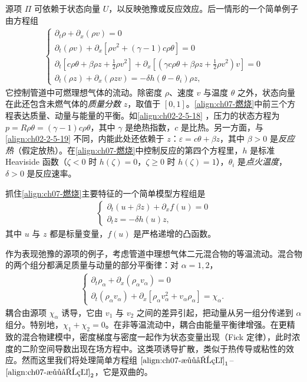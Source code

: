\documentclass[../../main.tex]{subfiles}
\begin{document}
源项 $\Pi$ 可依赖于状态向量 $U$，以反映弛豫或反应效应。后一情形的一个简单例子由方程组
\begin{align}
\begin{cases}
\partial_t\rho+\partial_x(\rho v)=0\\
\partial_t(\rho v)+\partial_x[\rho v^2+(\gamma-1)c\rho\theta]=0\\
\partial_t[c\rho\theta+\beta\rho z+\tfrac12\rho v^2]+\partial_x[(\gamma c\rho\theta+\beta\rho z+\tfrac12\rho v^2)v]=0\\
\partial_t(\rho z)+\partial_x(\rho z v)=-\delta h(\theta-\theta_i)\rho z,
\end{cases}
\label{align:ch07-燃烧}
\end{align}
它控制管道中可燃理想气体的流动。除密度 $\rho$、速度 $v$ 与温度 $\theta$ 之外，状态向量在此还包含未燃气体的\emph{质量分数} $z$，取值于 $[0,1]$。\eqref{align:ch07-燃烧}中前三个方程表达质量、动量与能量的平衡。如\eqref{align:ch02-2-5-18}
，压力的状态方程为 $p=R\rho\theta=(\gamma-1)c\rho\theta$，其中 $\gamma$ 是绝热指数，$c$ 是比热。另一方面，与\eqref{align:ch02-2-5-19}
不同，内能此处还依赖于 $z$：$\varepsilon=c\theta+\beta z$，其中 $\beta>0$ 是\emph{反应热}（假定放热）。在\eqref{align:ch07-燃烧}中控制反应的第四个方程里，$h$ 是标准 Heaviside 函数（$\zeta<0$ 时 $h(\zeta)=0$，$\zeta\geqslant0$ 时 $h(\zeta)=1$），$\theta_i$ 是\emph{点火温度}，$\delta>0$ 是反应速率。

抓住\eqref{align:ch07-燃烧}主要特征的一个简单模型方程组是
\begin{align}
\begin{cases}
\partial_t(u+\beta z)+\partial_x f(u)=0\\
\partial_t z=-\delta h(u)z,
\end{cases}
\label{align:ch07-燃烧模型}
\end{align}
其中 $u$ 与 $z$ 都是标量变量，$f(u)$ 是严格递增的凸函数。

作为表现弛豫的源项的例子，考虑管道中理想气体二元混合物的等温流动。混合物的两个组分都满足质量与动量的部分平衡律：对 $\alpha=1,2$，
\begin{align}
\begin{cases}
\partial_t\rho_\alpha+\partial_x(\rho_\alpha v_\alpha)=0\\
\partial_t(\rho_\alpha v_\alpha)+\partial_x[\rho_\alpha v_\alpha^2+v_\alpha\rho_\alpha]=\chi_\alpha.
\end{cases}
\label{align:ch07-混合物}
\end{align}
耦合由源项 $\chi_\alpha$ 诱导，它由 $v_1$ 与 $v_2$ 之间的差异引起，把动量从另一组分传递到 $\alpha$ 组分。特别地，$\chi_1+\chi_2=0$。在非等温流动中，耦合由能量平衡律增强。在更精致的混合物建模中，密度梯度与密度一起作为状态变量出现（Fick 定律），此时浓度的二阶空间导数出现在场方程中。这类项诱导扩散，类似于热传导或粘性的效应。然而这里我们将处理简单方程组 $\eqref{align:ch07-混合物}_1$--$\eqref{align:ch07-混合物}_2$，它是双曲的。
\end{document}
